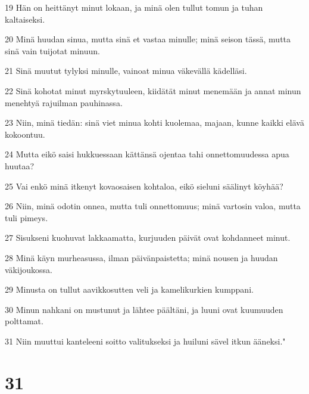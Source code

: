 \par 19 Hän on heittänyt minut lokaan, ja minä olen tullut tomun ja tuhan kaltaiseksi.
\par 20 Minä huudan sinua, mutta sinä et vastaa minulle; minä seison tässä, mutta sinä vain tuijotat minuun.
\par 21 Sinä muutut tylyksi minulle, vainoat minua väkevällä kädelläsi.
\par 22 Sinä kohotat minut myrskytuuleen, kiidätät minut menemään ja annat minun menehtyä rajuilman pauhinassa.
\par 23 Niin, minä tiedän: sinä viet minua kohti kuolemaa, majaan, kunne kaikki elävä kokoontuu.
\par 24 Mutta eikö saisi hukkuessaan kättänsä ojentaa tahi onnettomuudessa apua huutaa?
\par 25 Vai enkö minä itkenyt kovaosaisen kohtaloa, eikö sieluni säälinyt köyhää?
\par 26 Niin, minä odotin onnea, mutta tuli onnettomuus; minä vartosin valoa, mutta tuli pimeys.
\par 27 Sisukseni kuohuvat lakkaamatta, kurjuuden päivät ovat kohdanneet minut.
\par 28 Minä käyn murheasussa, ilman päivänpaistetta; minä nousen ja huudan väkijoukossa.
\par 29 Minusta on tullut aavikkosutten veli ja kamelikurkien kumppani.
\par 30 Minun nahkani on mustunut ja lähtee päältäni, ja luuni ovat kuumuuden polttamat.
\par 31 Niin muuttui kanteleeni soitto valitukseksi ja huiluni sävel itkun ääneksi."

\chapter{31}

